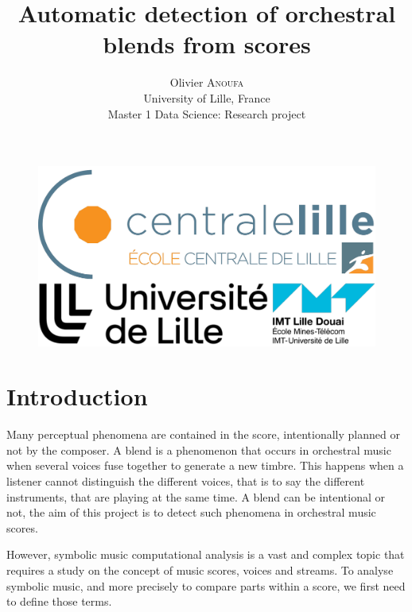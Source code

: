 \documentclass[11pt, a4paper]{article}
\begin{document}
% 

\begin{figure}[t]%
    \centering
    \includegraphics[width=.5\linewidth]{logos_empile}
\end{figure}

\title{Automatic detection of orchestral blends from scores}

\author{Olivier \textsc{Anoufa} \\  University of Lille, France \\ Master 1 Data Science: Research project}

{\let\newpage\relax\maketitle}

\newpage

\section*{Introduction}

Many perceptual phenomena are contained in the score, intentionally planned or not by the composer.
A blend is a phenomenon that occurs in orchestral music when several voices fuse together to generate a new timbre\cite{}.
This happens when a listener cannot distinguish the different voices, that is to say the different instruments, that are playing at the same time.
A blend can be intentional or not, the aim of this project is to detect such phenomena in orchestral music scores.


However, symbolic music computational analysis is a vast and complex topic that requires a study on the concept of music scores, voices and streams.
To analyse symbolic music, and more precisely to compare parts within a score, we first need to define those terms.
\end{document}
